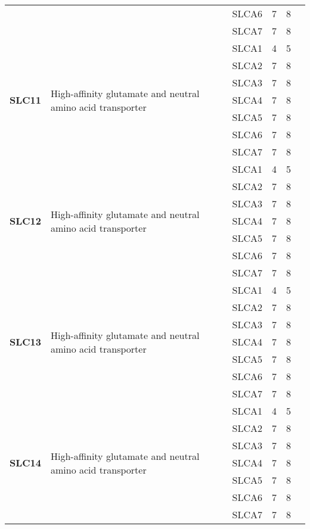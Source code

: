 \documentclass[12pt]{report}
\begin{document}
\begin{center}
\begin{longtable}{|p{1.5cm}|p{3.2cm}|p{1.9cm}|p{1.65cm}|p{3cm}|p{3cm}|}
\cline{3-6}
&&SLCA6&7 & 8&\\ 
\cline{3-6}
&&SLCA7&7 & 8&\\ 
\hline
\multirow{7}{1.5cm}{\textbf{SLC11}} & \multirow{7}{4cm}{High-affinity glutamate and neutral amino acid transporter} & SLCA1 & 4 & 5\\ 
\cline{3-6}
&&SLCA2&7 & 8&\\ 
\cline{3-6}
&&SLCA3&7 & 8&\\ 
\cline{3-6}
&&SLCA4&7 & 8&\\ 
\cline{3-6}
&&SLCA5&7 & 8&\\ 
\cline{3-6}
&&SLCA6&7 & 8&\\ 
\cline{3-6}
&&SLCA7&7 & 8&\\ 
\hline
\multirow{7}{1.5cm}{\textbf{SLC12}} & \multirow{7}{4cm}{High-affinity glutamate and neutral amino acid transporter} & SLCA1 & 4 & 5\\ 
\cline{3-6}
&&SLCA2&7 & 8&\\ 
\cline{3-6}
&&SLCA3&7 & 8&\\ 
\cline{3-6}
&&SLCA4&7 & 8&\\ 
\cline{3-6}
&&SLCA5&7 & 8&\\ 
\cline{3-6}
&&SLCA6&7 & 8&\\ 
\cline{3-6}
&&SLCA7&7 & 8&\\ 
\hline
\multirow{7}{1.5cm}{\textbf{SLC13}} & \multirow{7}{4cm}{High-affinity glutamate and neutral amino acid transporter} & SLCA1 & 4 & 5\\ 
\cline{3-6}
&&SLCA2&7 & 8&\\ 
\cline{3-6}
&&SLCA3&7 & 8&\\ 
\cline{3-6}
&&SLCA4&7 & 8&\\ 
\cline{3-6}
&&SLCA5&7 & 8&\\ 
\cline{3-6}
&&SLCA6&7 & 8&\\ 
\cline{3-6}
&&SLCA7&7 & 8&\\ 
\hline
\multirow{7}{1.5cm}{\textbf{SLC14}} & \multirow{7}{4cm}{High-affinity glutamate and neutral amino acid transporter} & SLCA1 & 4 & 5\\ 
\cline{3-6}
&&SLCA2&7 & 8&\\ 
\cline{3-6}
&&SLCA3&7 & 8&\\ 
\cline{3-6}
&&SLCA4&7 & 8&\\ 
\cline{3-6}
&&SLCA5&7 & 8&\\ 
\cline{3-6}
&&SLCA6&7 & 8&\\ 
\cline{3-6}
&&SLCA7&7 & 8&\\ 

\end{longtable}
\end{center}
\end{document}
